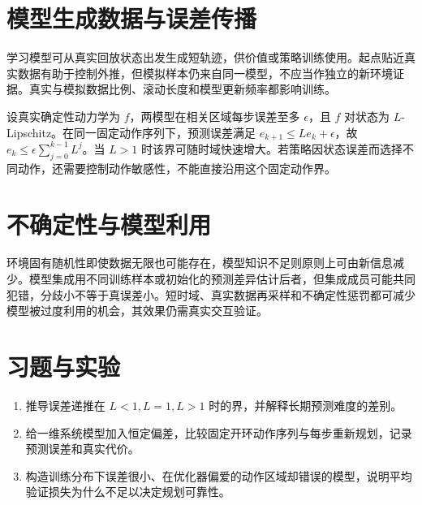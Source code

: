 \section{模型生成数据与误差传播}

学习模型可从真实回放状态出发生成短轨迹，供价值或策略训练使用。起点贴近真实数据有助于控制外推，但模拟样本仍来自同一模型，不应当作独立的新环境证据。真实与模拟数据比例、滚动长度和模型更新频率都影响训练。

设真实确定性动力学为 $f$，两模型在相关区域每步误差至多 $\epsilon$，且 $f$ 对状态为 $L$-Lipschitz。在同一固定动作序列下，预测误差满足 $e_{k+1}\leq Le_k+\epsilon$，故 $e_k\leq\epsilon\sum_{j=0}^{k-1}L^j$。当 $L>1$ 时该界可随时域快速增大。若策略因状态误差而选择不同动作，还需要控制动作敏感性，不能直接沿用这个固定动作界。

\section{不确定性与模型利用}

环境固有随机性即使数据无限也可能存在，模型知识不足则原则上可由新信息减少。模型集成用不同训练样本或初始化的预测差异估计后者，但集成成员可能共同犯错，分歧小不等于真误差小。短时域、真实数据再采样和不确定性惩罚都可减少模型被过度利用的机会，其效果仍需真实交互验证。

\section{习题与实验}
\begin{enumerate}
\item 推导误差递推在 $L<1,L=1,L>1$ 时的界，并解释长期预测难度的差别。
\item 给一维系统模型加入恒定偏差，比较固定开环动作序列与每步重新规划，记录预测误差和真实代价。
\item 构造训练分布下误差很小、在优化器偏爱的动作区域却错误的模型，说明平均验证损失为什么不足以决定规划可靠性。
\end{enumerate}





